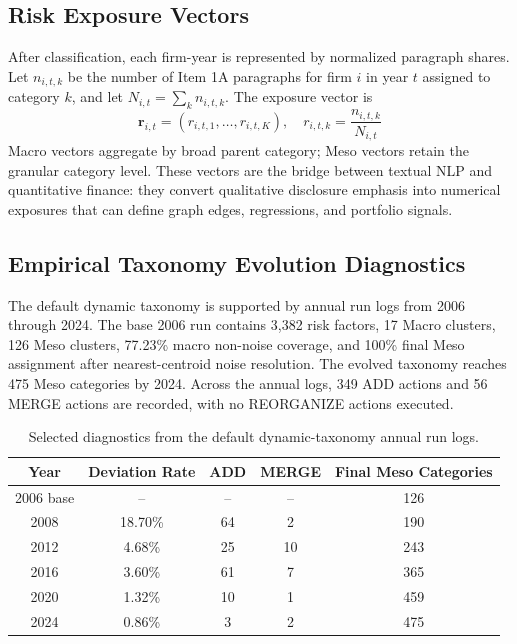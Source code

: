 \documentclass[11pt, a4paper]{article}
\begin{document}
\subsection{Risk Exposure Vectors}
After classification, each firm-year is represented by normalized paragraph shares. Let $n_{i,t,k}$ be the number of Item 1A paragraphs for firm $i$ in year $t$ assigned to category $k$, and let $N_{i,t}=\sum_{k}n_{i,t,k}$. The exposure vector is
\begin{equation}
\mathbf{r}_{i,t} = (r_{i,t,1}, \dots, r_{i,t,K}), \quad r_{i,t,k} = \frac{n_{i,t,k}}{N_{i,t}}
\end{equation}
Macro vectors aggregate by broad parent category; Meso vectors retain the granular category level. These vectors are the bridge between textual NLP and quantitative finance: they convert qualitative disclosure emphasis into numerical exposures that can define graph edges, regressions, and portfolio signals.

\subsection{Empirical Taxonomy Evolution Diagnostics}
The default dynamic taxonomy is supported by annual run logs from 2006 through 2024. The base 2006 run contains 3,382 risk factors, 17 Macro clusters, 126 Meso clusters, 77.23\% macro non-noise coverage, and 100\% final Meso assignment after nearest-centroid noise resolution. The evolved taxonomy reaches 475 Meso categories by 2024. Across the annual logs, 349 ADD actions and 56 MERGE actions are recorded, with no REORGANIZE actions executed.

\begin{table}[H]
\centering
\caption{Selected diagnostics from the default dynamic-taxonomy annual run logs.}
\label{tab:taxonomy_evolution_diagnostics}
\vspace{0.2cm}
\renewcommand{\arraystretch}{1.18}
\begin{tabular}{ccccc}
\toprule
\textbf{Year} & \textbf{Deviation Rate} & \textbf{ADD} & \textbf{MERGE} & \textbf{Final Meso Categories} \\
\midrule
2006 base & -- & -- & -- & 126 \\
2008 & 18.70\% & 64 & 2 & 190 \\
2012 & 4.68\% & 25 & 10 & 243 \\
2016 & 3.60\% & 61 & 7 & 365 \\
2020 & 1.32\% & 10 & 1 & 459 \\
2024 & 0.86\% & 3 & 2 & 475 \\
\bottomrule
\end{tabular}
\end{table}
\end{document}

